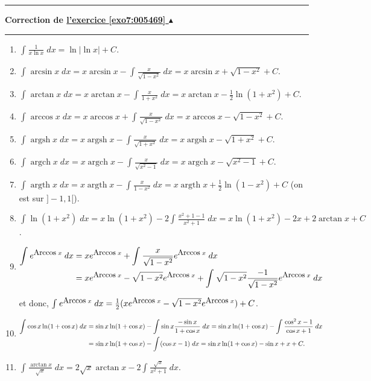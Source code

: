 \documentclass[11pt,a4paper]{article}
\newcommand{\Arcsin}{\mathop{\mathrm{arcsin}}\nolimits}
\newcommand{\Arccos}{\mathop{\mathrm{arccos}}\nolimits}
\newcommand{\Arctan}{\mathop{\mathrm{arctan}}\nolimits}
\newcommand{\Argsh}{\mathop{\mathrm{argsh}}\nolimits}
\newcommand{\Argch}{\mathop{\mathrm{argch}}\nolimits}
\newcommand{\Argth}{\mathop{\mathrm{argth}}\nolimits}
\newcounter{exo}
\newcommand{\correction}[1]{\hypertarget{cor7:#1}{}\label{cor7:#1}{\bf Correction de \hyperlink{exo7:#1}{l'exercice \ref{exo7:#1} $\blacktriangle$}}\vspace{1mm}\hrule\vspace{1mm}}
\newcommand{\fincorrection}{\vspace{1mm}\hrule\vspace*{7mm}}
\begin{document}
\fincorrection
\correction{005469}
\begin{enumerate}
\item  $\int_{}^{}\frac{1}{x\ln x}\;dx=\ln|\ln x|+C$.
\item  $\int_{}^{}\Arcsin x\;dx=x\Arcsin x-\int_{}^{}\frac{x}{\sqrt{1-x^2}}\;dx=x\Arcsin x+\sqrt{1-x^2}+C$.
\item  $\int_{}^{}\Arctan x\;dx=x\Arctan x-\int_{}^{}\frac{x}{1+x^2}\;dx=x\Arctan x-\frac{1}{2}\ln(1+x^2)+C$.
\item  $\int_{}^{}\Arccos x\;dx=x\Arccos x+\int_{}^{}\frac{x}{\sqrt{1-x^2}}\;dx=x\Arccos x-\sqrt{1-x^2}+C$.
\item  $\int_{}^{}\Argsh x\;dx=x\Argsh x-\int_{}^{}\frac{x}{\sqrt{1+x^2}}\;dx=x\Argsh x-\sqrt{1+x^2}+C$.
\item  $\int_{}^{}\Argch x\;dx=x\Argch x-\int_{}^{}\frac{x}{\sqrt{x^2-1}}\;dx=x\Argch x-\sqrt{x^2-1}+C$.
\item  $\int_{}^{}\Argth x\;dx=x\Argth x-\int_{}^{}\frac{x}{1-x^2}\;dx=x\Argth x+\frac{1}{2}\ln(1-x^2)+C$ (on est sur $]-1,1[$).
\item  $\int_{}^{}\ln(1+x^2)\;dx=x\ln(1+x^2)-2\int_{}^{}\frac{x^2+1-1}{x^2+1}\;dx=x\ln(1+x^2)-2x+2\Arctan x+C$.
\item  
\begin{align*}\ensuremath
\int_{}^{}e^{\mbox{\small{Arccos}}\;x}\;dx&=xe^{\mbox{\small{Arccos}}\;x}+\int_{}^{}\frac{x}{\sqrt{1-x^2}}e^{\mbox{\small{Arccos}}\;x}\;dx\\
 &=xe^{\mbox{\small{Arccos}}\;x}-\sqrt{1-x^2}e^{\mbox{\small{Arccos}}\;x}+\int_{}^{}\sqrt{1-x^2}\frac{-1}{\sqrt{1-x^2}}
 e^{\mbox{\small{Arccos}}\;x}\;dx
\end{align*}

et donc, $\int_{}^{}e^{\mbox{\small{Arccos}}\;x}\;dx=\frac{1}{2}(xe^{\mbox{\small{Arccos}}\;x}-\sqrt{1-x^2}e^{\mbox{\small{Arccos}}\;x})+C$.

\item 
\begin{align*}\ensuremath
\int_{}^{}\cos x\ln(1+\cos x)\;dx&=\sin x\ln(1+\cos x)-\int_{}^{}\sin x\frac{-\sin x}{1+\cos x}\;dx=\sin x\ln(1+\cos x)-\int_{}^{}\frac{\cos^2x-1}{\cos x+1}\;dx\\
 &=\sin x\ln(1+\cos x)-\int_{}^{}(\cos x-1)\;dx=\sin x\ln(1+\cos x)-\sin x+x+C.
\end{align*}
\item  $\int_{}^{}\frac{\Arctan x}{\sqrt{x}}\;dx=2\sqrt{x}\Arctan x-2\int_{}^{}\frac{\sqrt{x}}{x^2+1}\;dx$.


\end{enumerate}
\end{document}
